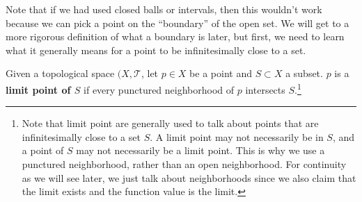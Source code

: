     Note that if we had used closed balls or intervals, then this wouldn't work because we can pick a point on the ``boundary'' of the open set. We will get to a more rigorous definition of what a boundary is later, but first, we need to learn what it generally means for a point to be infinitesimally close to a set. 

    \begin{definition}
      Given a topological space $(X, \mathscr{T}$, let $p \in X$ be a point and $S \subset X$ a subset. $p$ is a \textbf{limit point of $S$} if every punctured neighborhood of $p$ intersects $S$.\footnote{Note that limit point are generally used to talk about points that are infinitesimally close to a set $S$. A limit point may not necessarily be in $S$, and a point of $S$ may not necessarily be a limit point. This is why we use a punctured neighborhood, rather than an open neighborhood. For continuity as we will see later, we just talk about neighborhoods since we also claim that the limit exists and the function value is the limit.} 
    \end{definition}

